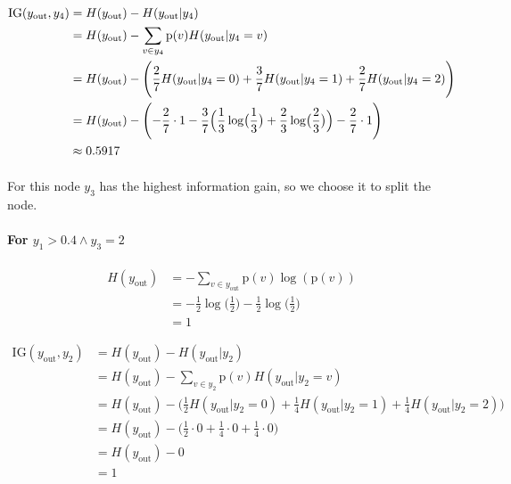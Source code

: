 \documentclass[12pt]{article}
\newcommand{\info}[2]{\frac{#1}{#2}\log\bigl( \frac{#1}{#2} \bigr)}
\begin{document}
\begin{enumerate}[leftmargin=\labelsep]
\begin{equation}
    \begin{split}
        \textrm{IG}(y_\textrm{out}, y_4) &= H(y_\textrm{out}) - H(y_\textrm{out}|y_4) \\
        & = H(y_\textrm{out}) - \sum_{v \in y_4}\textrm{p}(v)H(y_\textrm{out}|y_4=v) \\
        & = H(y_\textrm{out}) - \Biggl( \frac{2}{7}H(y_\textrm{out}|y_4=0) + \frac{3}{7}H(y_\textrm{out}|y_4=1) + \frac{2}{7}H(y_\textrm{out}|y_4=2)\Biggr) \\
        & = H(y_\textrm{out}) - \Biggl( -\frac{2}{7} \cdot 1 - \frac{3}{7}\Bigl( \info{1}{3} + \info{2}{3} \Bigr) - \frac{2}{7} \cdot 1\Biggr)\\
        & \approx 0.5917
    \end{split}
\end{equation}

\paragraph{} For this node $y_3$ has the highest information gain, so we choose it to split the node.

\paragraph{For $y_1 > 0.4 \wedge y_3=2$}

\begin{equation}
    \begin{split}
        H(y_\textrm{out}) & = -\sum_{v \in y_\textrm{out}}\textrm{p}(v)\log(\textrm{p}(v)) \\
        & = -\info{1}{2} - \info{1}{2} \\
        & = 1
    \end{split}
\end{equation}

\begin{equation}
    \begin{split}
        \textrm{IG}(y_\textrm{out}, y_2) &= H(y_\textrm{out}) - H(y_\textrm{out}|y_2) \\
        & = H(y_\textrm{out}) - \sum_{v \in y_2}\textrm{p}(v)H(y_\textrm{out}|y_2=v) \\
        & = H(y_\textrm{out}) - \Biggl( \frac{1}{2}H(y_\textrm{out}|y_2=0) + \frac{1}{4}H(y_\textrm{out}|y_2=1) + \frac{1}{4}H(y_\textrm{out}|y_2=2)\Biggr) \\
        & = H(y_\textrm{out}) - \Biggl( \frac{1}{2} \cdot 0 + \frac{1}{4} \cdot 0 + \frac{1}{4} \cdot 0  \Biggr) \\
        & = H(y_\textrm{out}) - 0 \\
        & = 1
    \end{split}
\end{equation}


\end{enumerate}
\end{document}
